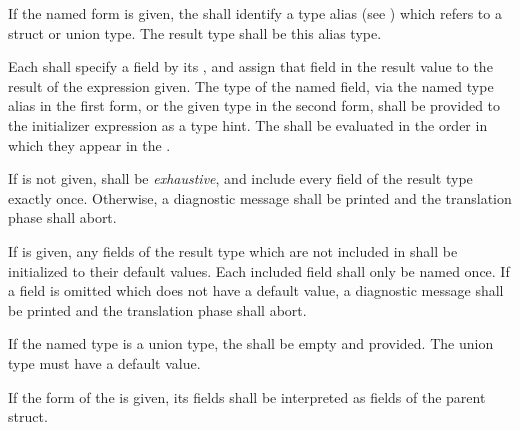 \specsubsubitem
If the named form is given, the  shall identify a type
alias (see ) which refers to a struct or union type.
The result type shall be this alias type.

\specsubsubitem
Each  shall specify a field by its ,
and assign that field in the result value to the result of the expression
given. The type of the named field, via the named type alias in the first form,
or the given type in the second form, shall be provided to the initializer
expression as a type hint. The  shall be evaluated in
the order in which they appear in the .

\specsubsubitem
If  is not given,  shall be
\textit{exhaustive}, and include every field of the result type exactly once.
Otherwise, a diagnostic message shall be printed and the translation phase
shall abort.

\specsubsubitem
If  is given, any fields of the result type which are not
included in  shall be initialized to their default
values. Each included field shall only be named once. If a field is omitted
which does not have a default value, a diagnostic message shall be printed and
the translation phase shall abort.

\specsubsubitem
If the named type is a union type, the  shall be
empty and  provided. The union type must have a default value.

\specsubsubitem
If the  form of the  is
given, its fields shall be interpreted as fields of the parent struct.



\begin{grammar}
 \\
	\terminal{(}  \terminal{)} \\

 \\
	 \terminal{,}  \optional{\terminal{,}} \\
	 \terminal{,}  \\
\end{grammar}

